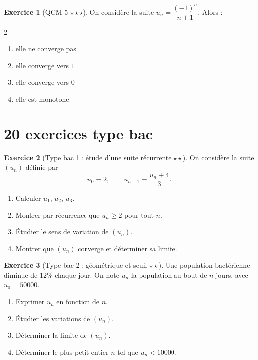 \documentclass[11pt,a4paper]{article}
\theoremstyle{definition}
\newtheorem{exercice}{Exercice}[section]
\newcommand{\etoile}[1]{\hfill{\small\textbf{#1}}}
\begin{document}
\begin{exercice}[QCM 5 \etoile{$\star\star\star$}]
On considère la suite $u_n=\dfrac{(-1)^n}{n+1}$. Alors :
\begin{multicols}{2}
\begin{enumerate}[label=\Alph*.]
    \item elle ne converge pas
    \item elle converge vers $1$
    \item elle converge vers $0$
    \item elle est monotone
\end{enumerate}
\end{multicols}
\end{exercice}

\section{20 exercices type bac}

\begin{exercice}[Type bac 1 : étude d'une suite récurrente \etoile{$\star\star$}]
On considère la suite $(u_n)$ définie par
\[
u_0=2,\qquad u_{n+1}=\frac{u_n+4}{3}.
\]
\begin{enumerate}[label=\arabic*.]
    \item Calculer $u_1$, $u_2$, $u_3$.
    \item Montrer par récurrence que $u_n\ge 2$ pour tout $n$.
    \item Étudier le sens de variation de $(u_n)$.
    \item Montrer que $(u_n)$ converge et déterminer sa limite.
\end{enumerate}
\end{exercice}

\begin{exercice}[Type bac 2 : géométrique et seuil \etoile{$\star\star$}]
Une population bactérienne diminue de $12\%$ chaque jour. On note $u_n$ la population au bout de $n$ jours, avec $u_0=50000$.
\begin{enumerate}[label=\arabic*.]
    \item Exprimer $u_n$ en fonction de $n$.
    \item Étudier les variations de $(u_n)$.
    \item Déterminer la limite de $(u_n)$.
    \item Déterminer le plus petit entier $n$ tel que $u_n<10000$.
\end{enumerate}
\end{exercice}
\end{document}
